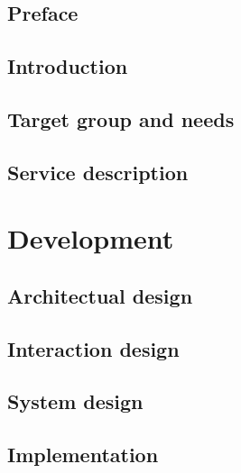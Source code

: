 \frontmatter
\chapter*{Preface}

\chapter{Introduction}


\chapter{Target group and needs}


\chapter{Service description}


\mainmatter
\part{Development}

\chapter{Architectual design}


\chapter{Interaction design}


\chapter{System design}


\chapter{Implementation}


%
%


%

%


\backmatter



